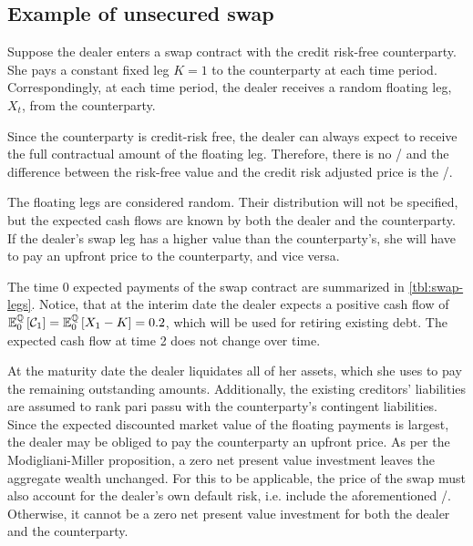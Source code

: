 \documentclass[main.tex]{subfiles}
\begin{document}
    \subsection{Example of unsecured swap}
        Suppose the dealer enters a swap contract with the credit risk-free counterparty.
        She pays a constant fixed leg $K=\num{1}$ to the counterparty at each time period.
        Correspondingly, at each time period,
        the dealer receives a random floating leg, $X_t$, from the counterparty.

        Since the counterparty is credit-risk free,
        the dealer can always expect to receive the full contractual amount of the floating leg.
        Therefore, there is no \CVA/ and
        the difference between the risk-free value and the credit risk adjusted price is the \DVA/.

        The floating legs are considered random.
        Their distribution will not be specified,
        but the expected cash flows are known
        by both the dealer and the counterparty.
        If the dealer's swap leg has a higher value than the counterparty's,
        she will have to pay an upfront price to the counterparty,
        and vice versa.

        The time 0 expected payments of the swap contract are summarized in \cref{tbl:swap-legs}.
        Notice, that at the interim date the dealer expects a positive cash flow of
        $\mathbb{E}_{0}^{\mathbb{Q}}\left[\mathcal{C}_1\right] = \mathbb{E}_{0}^{\mathbb{Q}}\left[X_1 - K\right] = \num{0.2}$,
        which will be used for retiring existing debt.
        The expected cash flow at time 2 does not change over time.

        At the maturity date the dealer liquidates all of her assets,
        which she uses to pay the remaining outstanding amounts.
        Additionally, the existing creditors' liabilities are assumed to rank pari passu with the counterparty's contingent liabilities.
        \\
        Since the expected discounted market value of the floating payments is largest,
        the dealer may be obliged to pay the counterparty an upfront price.
        As per the Modigliani-Miller proposition, 
        a zero net present value investment leaves the aggregate wealth unchanged.
        For this to be applicable, the price of the swap must also account for the dealer's own default risk,
        i.e. include the aforementioned \DVA/.
        Otherwise, it cannot be a zero net present value investment for both the dealer and the counterparty.
\end{document}
